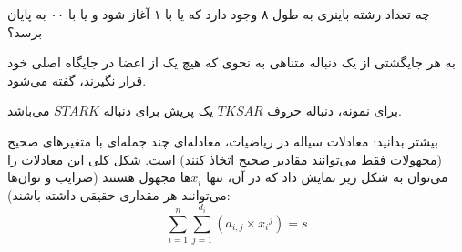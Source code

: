 \documentclass[
    11pt,
    largemargins,
    twoside,
    template_root=../,
    reference_icons=./Icons,
]{../BOOK}
\begin{document}
            \begin{PROBLEM}
                \p
                چه تعداد رشته باینری به طول ۸ وجود دارد که یا با ۱ آغاز شود و یا با ۰۰ به پایان برسد؟
            
            \end{PROBLEM}


                \begin{DEFINITION}
                    \p
                    به هر جایگشتی از یک دنباله متناهی به نحوی که هیچ یک از اعضا در
                    جایگاه اصلی خود قرار نگیرند،
                    گفته می‌شود.
                \end{DEFINITION}

                \p
                برای نمونه،
                دنباله حروف
                $TKSAR$
                یک پریش برای دنباله
                $STARK$
                می‌باشد.

                \begin{EXTRA}{بیشتر بدانید: معادلات سیاله}
                    \p
                    در ریاضیات،
                    معادله‌ای چند جمله‌ای با متغیرهای صحیح
                    (مجهولات فقط می‌توانند مقادیر صحیح اتخاذ کنند)
                    است. شکل کلی این معادلات را می‌توان به شکل زیر نمایش داد
                    که در آن، تنها ‌$x_i$ها مجهول هستند
                    (ضرایب و توان‌ها می‌توانند هر مقداری حقیقی داشته باشند): 
                    $$\sum\limits_{i=1}^{n} \sum\limits_{j=1}^{d_i} ({a_{i,j}} \times {x_i}^{j}) = s$$
                \end{EXTRA}
\end{document}
